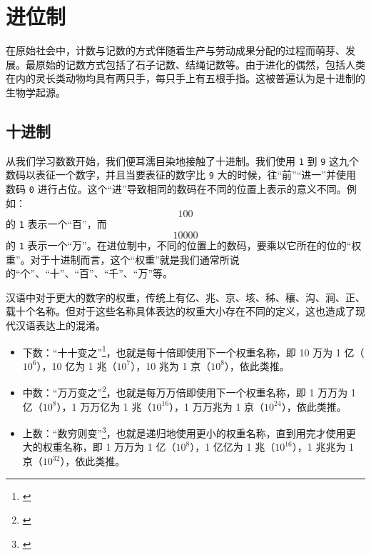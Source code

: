 \section{进位制}\label{sec:ArithBasics/positional-notation}
    在原始社会中，计数与记数的方式伴随着生产与劳动成果分配的过程而萌芽、发展。最原始的记数方式包括了石子记数、结绳记数等。由于进化的偶然，包括人类在内的灵长类动物均具有两只手，每只手上有五根手指。这被普遍认为是十进制的生物学起源。\\
    \subsection{十进制}\label{subsec:ArithBasics/positional-notation/decimal}
        从我们学习数数开始，我们便耳濡目染地接触了十进制。我们使用 \texttt{1} 到 \texttt{9} 这九个数码以表征一个数字，并且当要表征的数字比 \texttt{9} 大的时候，往“前”“进一”并使用数码 \texttt{0} 进行占位。这个“进”导致相同的数码在不同的位置上表示的意义不同。例如：
        \[100\]
        的 \texttt{1} 表示一个“百”，而
        \[10000\]
        的 \texttt{1} 表示一个“万”。在进位制中，不同的位置上的数码，要乘以它所在的位的“权重”。对于十进制而言，这个“权重”就是我们通常所说的“个”、“十”、“百”、“千”、“万”等。
        \begin{displayquote}
            汉语中对于更大的数字的权重，传统上有亿、兆、京、垓、秭、穰、沟、涧、正、载十个名称。但对于这些名称具体表达的权重大小存在不同的定义，这也造成了现代汉语表达上的混淆。\\
            \begin{itemize}
                \item 下数：“十十变之”\footnote{\cite{wujin}}，也就是每十倍即使用下一个权重名称，即 10 万为 1 亿（$10^6$），10 亿为 1 兆（$10^7$），10 兆为 1 京（$10^8$），依此类推。
                \item 中数：“万万变之”\footnote{\cite{wujin}}，也就是每万万倍即使用下一个权重名称，即 1 万万为 1 亿（$10^8$），1 万万亿为 1 兆（$10^{16}$），1 万万兆为 1 京（$10^{24}$），依此类推。
                \item 上数：“数穷则变”\footnote{\cite{wujin}}，也就是递归地使用更小的权重名称，直到用完才使用更大的权重名称，即 1 万万为 1 亿（$10^8$），1 亿亿为 1 兆（$10^{16}$），1 兆兆为 1 京（$10^{32}$），依此类推。
            \end{itemize}
        \end{displayquote}
